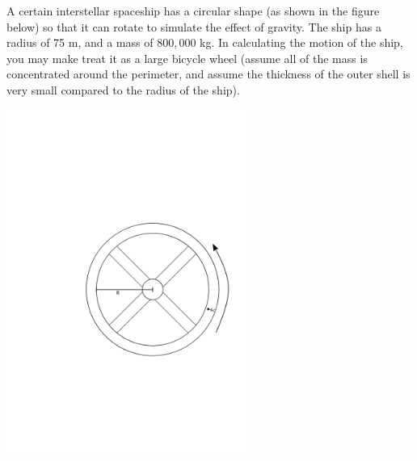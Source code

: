 \question A certain interstellar spaceship has a circular shape (as shown in the figure below) so that it can rotate to simulate the effect of gravity. The ship has a radius of 75 m, and a mass of $800,000$ kg. In calculating the motion of the ship, you may make treat it as a large bicycle wheel (assume all of the mass is concentrated around the perimeter, and assume the thickness of the outer shell is very small compared to the radius of the ship).

\begin{center}
	\includegraphics[width=8cm]{spaceship}
\end{center}

